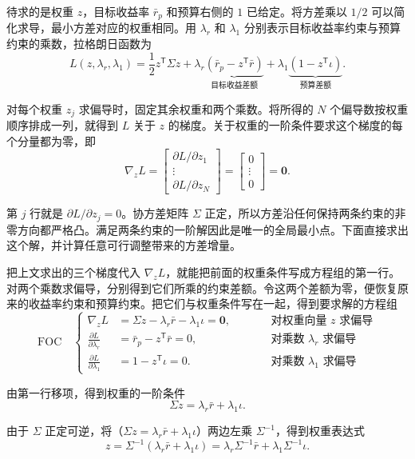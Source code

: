 \begin{solution}[label-content={证明},blank-type=none]
待求的是权重 $z$，目标收益率 $\bar r_p$ 和预算右侧的 $1$ 已给定。将方差乘以 $1/2$ 可以简化求导，最小方差对应的权重相同。用 $\lambda_r$ 和 $\lambda_1$ 分别表示目标收益率约束与预算约束的乘数，拉格朗日函数为
\[
 L(z,\lambda_r,\lambda_1)=\frac12z^{\mathsf T}\Sigma z
 +\lambda_r\underbrace{(\bar r_p-z^{\mathsf T}\bar r)}_{\text{目标收益差额}}
 +\lambda_1\underbrace{(1-z^{\mathsf T}\iota)}_{\text{预算差额}}.
\]

对每个权重 $z_j$ 求偏导时，固定其余权重和两个乘数。将所得的 $N$ 个偏导数按权重顺序排成一列，就得到 $L$ 关于 $z$ 的梯度。关于权重的一阶条件要求这个梯度的每个分量都为零，即
\[
 \nabla_z L
 =\begin{bmatrix}
 \partial L/\partial z_1\\
 \vdots\\
 \partial L/\partial z_N
 \end{bmatrix}
 =\begin{bmatrix}0\\ \vdots\\ 0\end{bmatrix}
 =\mathbf{0}.
\]

第 $j$ 行就是 $\partial L/\partial z_j=0$。协方差矩阵 $\Sigma$ 正定，所以方差沿任何保持两条约束的非零方向都严格凸。满足两条约束的一阶解因此是唯一的全局最小点。下面直接求出这个解，并计算任意可行调整带来的方差增量。

把上文求出的三个梯度代入 $\nabla_z L$，就能把前面的权重条件写成方程组的第一行。对两个乘数求偏导，分别得到它们所乘的约束差额。令这两个差额为零，便恢复原来的收益率约束和预算约束。把它们与权重条件写在一起，得到要求解的方程组
\[
 \mathrm{FOC}\quad\left\{
 \begin{alignedat}{2}
 \nabla_z L &= \Sigma z-\lambda_r\bar r-\lambda_1\iota=\mathbf{0},
 &\qquad& \text{对权重向量 }z\text{ 求偏导}\\
 \frac{\partial L}{\partial\lambda_r} &= \bar r_p-z^{\mathsf T}\bar r=0,
 &\qquad& \text{对乘数 }\lambda_r\text{ 求偏导}\\
 \frac{\partial L}{\partial\lambda_1} &= 1-z^{\mathsf T}\iota=0.
 &\qquad& \text{对乘数 }\lambda_1\text{ 求偏导}
 \end{alignedat}
 \right.
\]

由第一行移项，得到权重的一阶条件
\[
 \Sigma z=\lambda_r\bar r+\lambda_1\iota.
\]

由于 $\Sigma$ 正定可逆，将（$\Sigma z=\lambda_r\bar r+\lambda_1\iota$）两边左乘 $\Sigma^{-1}$，得到权重表达式
\[
 z=\Sigma^{-1}(\lambda_r\bar r+\lambda_1\iota)
 =\lambda_r\Sigma^{-1}\bar r+\lambda_1\Sigma^{-1}\iota.
\]


\end{solution}
